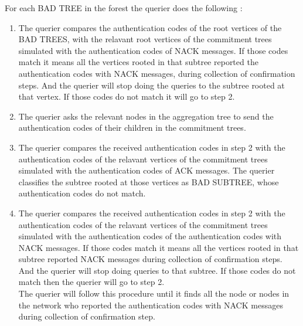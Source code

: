 For each BAD TREE in the forest the querier does the following :

\begin{enumerate}
  
  \item  
  The querier compares the authentication codes of the root vertices of the BAD TREES, with the relavant root vertices of the commitment trees simulated with the authentication codes of NACK messages. If those codes match it means all the vertices rooted in that subtree reported the authentication codes with NACK messages, during collection of confirmation steps. And the querier will stop doing the queries to the subtree rooted at that vertex. If those codes do not match it will go to step 2.

  \item 
  The querier asks the relevant nodes in the aggregation tree to send the authentication codes of their children in the commitment trees.

  \item
  The querier compares the received authentication codes in step 2 with the authentication codes of the relavant vertices of the commitment trees simulated with the authentication codes of ACK messages. The querier classifies the subtree rooted at those vertices as BAD SUBTREE, whose authentication codes do not match.

  \item 
  The querier compares the received authentication codes in step 2 with the authentication codes of the relavant vertices of the commitment trees simulated with the authentication codes of the authentication codes with NACK messages. If those codes match it means all the vertices rooted in that subtree reported NACK messages during collection of confirmation steps. And the querier will stop doing queries to that subtree. If those codes do not match then the querier will go to step 2. \\

  The querier will follow this procedure until it finds all the node or nodes in the network who reported the authentication codes with NACK messages during collection of confirmation step.

\end{enumerate}


  

